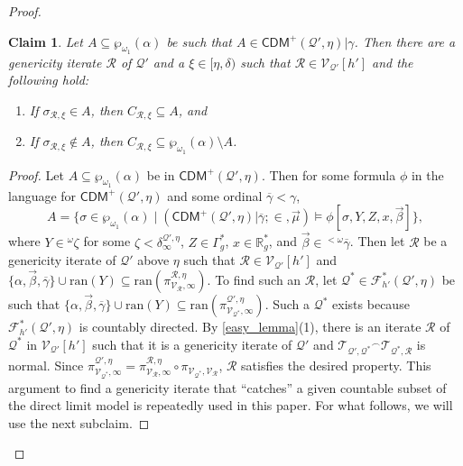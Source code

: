 \documentclass{amsart}
\newtheorem{claim}{Claim}[dfn]
\renewcommand{\subset}{\subseteq}
\newcommand{\power}{\wp}
\begin{document}
\begin{proof}
\begin{claim}\label{club_dichotomy}
    Let $A\subset\power_{\omega_1}(\alpha)$ be such that $A\in\mathsf{CDM}^+(\mathcal{Q}', \eta)\vert\gamma$.
    Then there are a genericity iterate $\mathcal{R}$ of $\mathcal{Q}'$ and a $\xi\in [\eta, \delta)$ such that $\mathcal{R}\in\mathcal{V}_{\mathcal{Q}'}[h']$ and the following hold:
    \begin{enumerate}
        \item If $\sigma_{\mathcal{R}, \xi}\in A$, then $C_{\mathcal{R}, \xi}\subset A$, and
        \item If $\sigma_{\mathcal{R}, \xi}\notin A$, then $C_{\mathcal{R}, \xi}\subset\power_{\omega_1}(\alpha)\setminus A$.
    \end{enumerate}
\end{claim}
\begin{proof}
    Let $A\subset\power_{\omega_1}(\alpha)$ be in $\mathsf{CDM}^+(\mathcal{Q}', \eta)$.
    Then for some formula $\phi$ in the language for $\mathsf{CDM}^+(\mathcal{Q}', \eta)$ and some ordinal $\overline{\gamma}<\gamma$,
    \[
    A=\{\sigma\in\power_{\omega_1}(\alpha)\mid(\mathsf{CDM}^+(\mathcal{Q}', \eta)\vert\overline{\gamma}; {\in}, \vec{\mu})\models\phi[\sigma, Y, Z, x, \vec{\beta}]\},
    \]
    where $Y\in {}^{\omega}\zeta$ for some $\zeta<\delta^{\mathcal{Q}', \eta}_{\infty}$, $Z\in\Gamma^*_g$, $x\in\mathbb{R}^*_g$, and $\vec{\beta}\in{}^{<\omega}\overline{\gamma}$.
    Then let $\mathcal{R}$ be a genericity iterate of $\mathcal{Q}'$ above $\eta$ such that $\mathcal{R}\in\mathcal{V}_{\mathcal{Q}'}[h']$ and $\{\alpha, \vec{\beta}, \overline{\gamma}\}\cup\mathrm{ran}(Y)\subset\mathrm{ran}(\pi^{\mathcal{R}, \eta}_{\mathcal{V}_{\mathcal{R}}, \infty})$.
    To find such an $\mathcal{R}$, let $\mathcal{Q}^*\in\mathcal{F}^*_{h'}(\mathcal{Q}', \eta)$ be such that $\{\alpha, \vec{\beta}, \overline{\gamma}\}\cup\mathrm{ran}(Y)\subset\mathrm{ran}(\pi^{\mathcal{Q}', \eta}_{\mathcal{V}_{\mathcal{Q}^*}, \infty})$.
    Such a $\mathcal{Q}^*$ exists because $\mathcal{F}^*_{h'}(\mathcal{Q}', \eta)$ is countably directed.
    By \cref{easy_lemma}(1), there is an iterate $\mathcal{R}$ of $\mathcal{Q}^*$ in $\mathcal{V}_{\mathcal{Q}'}[h']$ such that it is a genericity iterate of $\mathcal{Q}'$ and $\mathcal{T}_{\mathcal{Q}', \mathcal{Q}^*}{}^{\frown}\mathcal{T}_{\mathcal{Q}^*, \mathcal{R}}$ is normal.
    Since $\pi^{\mathcal{Q}', \eta}_{\mathcal{V}_{\mathcal{Q}^*}, \infty}=\pi^{\mathcal{R}, \eta}_{\mathcal{V}_{\mathcal{R}}, \infty}\circ\pi_{\mathcal{V}_{\mathcal{Q}^*}, \mathcal{V}_{\mathcal{R}}}$, $\mathcal{R}$ satisfies the desired property.
    This argument to find a genericity iterate that ``catches'' a given countable subset of the direct limit model is repeatedly used in this paper.
    For what follows, we will use the next subclaim.


\end{proof}
\end{proof}
\end{document}
